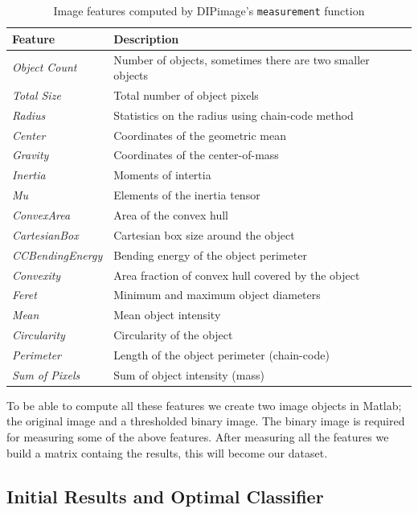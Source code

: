 \documentclass{article}
\begin{document}
\begin{table}[H]
    \small
	\centering
    \begin{tabular}{|l|l|}
    \hline
    \textbf{Feature} & \textbf{Description} \\
    \hline
    \emph{Object Count}     & Number of objects, sometimes there are two smaller objects \\
    \emph{Total Size}       & Total number of object pixels           \\
    \emph{Radius}       	& Statistics on the radius using chain-code method           \\
    \emph{Center}  		& Coordinates of the geometric mean \\
    \emph{Gravity} 		& Coordinates of the center-of-mass \\
    \emph{Inertia} 		& Moments of intertia \\
    \emph{Mu} 				& Elements of the inertia tensor \\
    \emph{ConvexArea} 		& Area of the convex hull \\
    \emph{CartesianBox} 	& Cartesian box size around the object \\
    \emph{CCBendingEnergy} & Bending energy of the object perimeter \\
    \emph{Convexity} 		& Area fraction of convex hull covered by the object \\
    \emph{Feret} 			& Minimum and maximum object diameters \\
    \emph{Mean} 			& Mean object intensity \\
    \emph{Circularity} 	& Circularity of the object \\
    \emph{Perimeter} 		& Length of the object perimeter (chain-code) \\
    \emph{Sum of Pixels} 	& Sum of object intensity (mass) \\
    \hline
    \end{tabular}
    \caption{Image features computed by DIPimage's \texttt{measurement} function \label{table:image-features}}
\end{table}

To be able to compute all these features we create two image objects in Matlab; the original image and a thresholded binary image. The binary image is required for measuring some of the above features. After measuring all the features we build a matrix containg the results, this will become our dataset. 

\subsection{Initial Results and Optimal Classifier}
\end{document}
